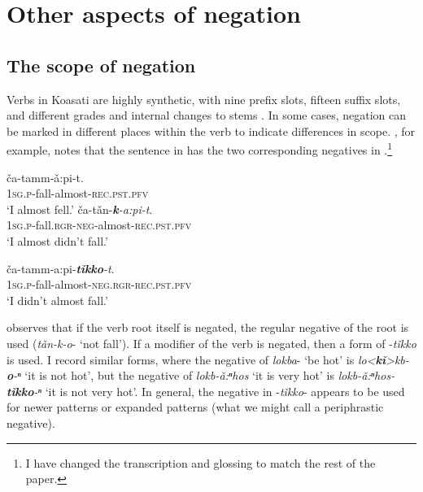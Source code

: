 \documentclass[output=paper,colorlinks,citecolor=brown]{langscibook}
\begin{document}
\section{Other aspects of negation}\label{sec:koa:4}
\subsection{The scope of negation}\label{sec:koa:4.1}

Verbs in Koasati are highly synthetic, with nine prefix slots, fifteen suffix slots, and different grades and internal changes to stems \citep{Kimball1991}. In some cases, negation can be marked in different places within the verb to indicate differences in scope. \citet[196--197]{Kimball1991}, for example, notes that the sentence in  has the two corresponding negatives in .\footnote{I have changed the transcription and glossing to match the rest of the paper.}


\ea\label{ex:koa:46}
    \gll ča-tamm-ǎ:pi-t. \\ 
         1\textsc{sg.p}-fall-almost-\textsc{rec.pst}.\textsc{pfv} \\
    \glt ‘I almost fell.’
\z 
\ea\label{ex:koa:47}
    \ea\label{ex:koa:47a}
        \gll ča-tǎn-\textbf{\textit{k}}\textit{-a:pi-t}. \\
             1\textsc{sg.p}-fall.\textsc{rgr-neg}-almost-\textsc{rec.pst}.\textsc{pfv} \\
        \glt ‘I almost didn’t fall.’
    
    \ex\label{ex:koa:47b}
        \gll ča-tamm-a:pi-\textbf{\textit{tǐkko}}\textit{-t}. \\
             1\textsc{sg.p}-fall-almost-\textsc{neg.rgr}-\textsc{rec.pst}.\textsc{pfv} \\
        \glt ‘I didn’t almost fall.’
    \z
\z 

\citet[197]{Kimball1991} observes that if the verb root itself is negated, the regular negative of the root is used (\textit{tǎn-k-o}- ‘not fall’). If a modifier of the verb is negated, then a form of -\textit{tǐkko} is used. I record similar forms, where the negative of \textit{lokba}- ‘be hot’ is \textit{lo<\textbf{kǐ}>kb-\textbf{o}-ⁿ} ‘it is not hot’, but the negative of \textit{lokb-ǎ:ⁿhos} ‘it is very hot’ is \textit{lokb-ǎ:ⁿhos-\textbf{tǐkko}-ⁿ} ‘it is not very hot’. In general, the negative in -\textit{tǐkko}- appears to be used for newer patterns or expanded patterns (what we might call a periphrastic negative).
\end{document}
